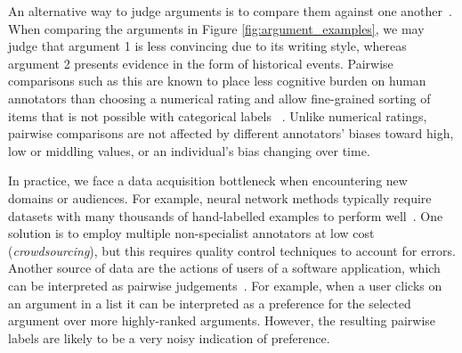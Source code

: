 An alternative way to judge arguments is to compare them against one another~\cite{habernal2016argument}.
When comparing the arguments in Figure \ref{fig:argument_examples}, we may judge that argument 1 is less convincing due to its writing style, whereas argument 2 
presents evidence in the form of historical events.
Pairwise comparisons such as this are known to place less cognitive burden on human annotators than  
choosing a numerical rating and allow fine-grained sorting of items that is not possible with categorical labels
~\cite{kendall1948rank,kingsley2006preference}.
Unlike numerical ratings, pairwise comparisons are not affected by different annotators' biases
toward high, low or middling values, or an individual's bias changing over time.

In practice, we face a data acquisition bottleneck when encountering new domains or audiences.
For example, neural network methods typically require datasets with 
many thousands of hand-labelled examples to perform well~\cite{srivastava2014dropout,collobert2011natural}.
One solution is to employ multiple non-specialist annotators at low cost (\emph{crowdsourcing}), 
but this requires quality control techniques to account for errors.
Another source of data are the actions of users of a software application, which can be interpreted as pairwise judgements~\cite{joachims2002optimizing}. For example, when a user clicks on an argument in a list it can be interpreted
 as a preference for the selected argument over more highly-ranked arguments.
However, the resulting pairwise labels are likely to be a very noisy indication of preference.

